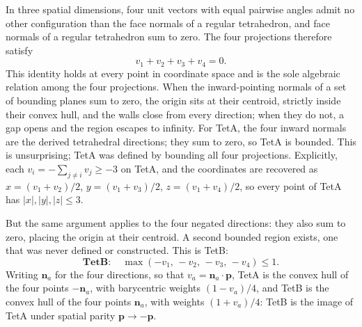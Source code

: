 \documentclass[twocolumn]{iopjournal}
\begin{document}
In three spatial dimensions, four unit vectors with equal pairwise angles
admit no other configuration than the face normals of a regular
tetrahedron, and face normals of a regular tetrahedron sum to zero. The
four projections therefore satisfy
\begin{equation}
v_1 + v_2 + v_3 + v_4 = 0.
\end{equation}
This identity holds at every point in coordinate space and is the sole
algebraic relation among the four projections. When the inward-pointing
normals of a set of bounding planes sum to zero, the origin sits at their
centroid, strictly inside their convex hull, and the walls close from
every direction; when they do not, a gap opens and the region escapes to
infinity. For TetA, the four inward normals are the derived tetrahedral
directions; they sum to zero, so TetA is bounded. This is unsurprising;
TetA was defined by bounding all four projections.
Explicitly, each $v_i = -\sum_{j\neq i} v_j \geq -3$ on TetA, and the
coordinates are recovered as $x = (v_1+v_2)/2$, $y = (v_1+v_3)/2$,
$z = (v_1+v_4)/2$, so every point of TetA has $|x|,|y|,|z| \leq 3$.

But the same argument applies to the four negated directions: they also sum to
zero, placing the origin at their centroid. A second bounded region
exists, one that was never defined or constructed. This is TetB:
\begin{equation}
\textbf{TetB}: \quad \max(-v_1,\, -v_2,\, -v_3,\, -v_4) \leq 1.
\end{equation}
Writing $\mathbf{n}_a$ for the four directions, so that $v_a = \mathbf{n}_a\cdot\mathbf{p}$,
TetA is the convex hull of the four points $-\mathbf{n}_a$, with barycentric
weights $(1-v_a)/4$, and TetB is the convex hull of the four points
$\mathbf{n}_a$, with weights $(1+v_a)/4$: TetB is the image of TetA under
spatial parity $\mathbf{p}\to-\mathbf{p}$.
\end{document}
